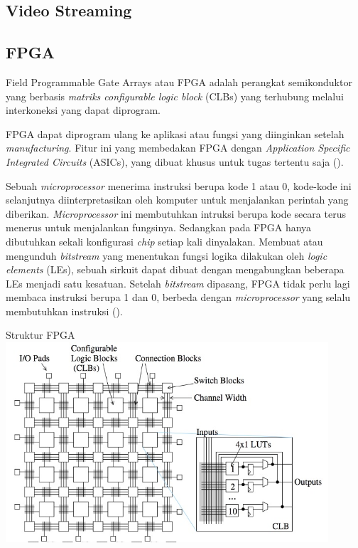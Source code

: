 \subsection{Video Streaming}
\blindtext

\subsection{FPGA}
Field Programmable Gate Arrays atau FPGA adalah perangkat semikonduktor yang berbasis \textit{matriks configurable logic block} (CLBs) yang terhubung melalui interkoneksi yang dapat diprogram.

FPGA dapat diprogram ulang ke aplikasi atau fungsi yang diinginkan setelah \textit{manufacturing}. Fitur ini yang membedakan FPGA dengan \textit{Application Specific Integrated Circuits} (ASICs), yang dibuat khusus untuk tugas tertentu saja (\cite{XILINX}).

Sebuah \textit{microprocessor} menerima instruksi berupa kode 1 atau 0, kode-kode ini selanjutnya diinterpretasikan oleh komputer untuk menjalankan perintah yang diberikan. \textit{Microprocessor} ini membutuhkan intruksi berupa kode secara terus menerus untuk menjalankan fungsinya. Sedangkan pada FPGA hanya dibutuhkan sekali konfigurasi \textit{chip} setiap kali dinyalakan. Membuat atau mengunduh \textit{bitstream} yang menentukan fungsi logika dilakukan oleh \textit{logic elements} (LEs), sebuah sirkuit dapat dibuat dengan mengabungkan beberapa LEs menjadi satu kesatuan. Setelah \textit{bitstream} dipasang, FPGA tidak perlu lagi membaca instruksi berupa 1 dan 0, berbeda dengan \textit{microprocessor} yang selalu membutuhkan instruksi (\cite{pdf:cheung}).

\begin{afigure}{Struktur FPGA}
    \label{fig:fpga-structure}
    \includegraphics[width=12cm, center]{images/fpga-structure.jpeg}
\end{afigure}


